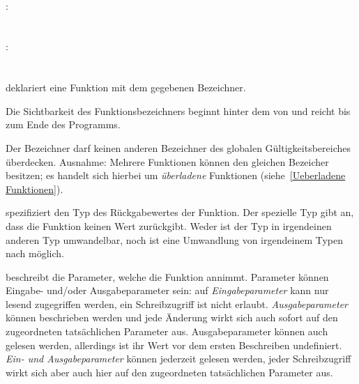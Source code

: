 \hspace*{1cm}\glq{}\grq \glq{}\grq  {}   \glq\Gt{=}\grq  {} \glq\Gt{,}\grq  {} \\
:\label{funktion_aufruf}\\
\hspace*{1cm}  \glq\Gt{(}\grq  \glq\Gt{)}\grq \\
\hspace*{1cm}  \glq\Gt{(}\grq {}  \glq\Gt{)}\grq \\
:\label{funktion_param_tatsaechl}\\
\hspace*{1cm} \\
\hspace*{1cm} \glq\Gt{,}\grq  {} \\


 deklariert eine Funktion mit dem gegebenen Bezeichner.

Die Sichtbarkeit des Funktionsbezeichners beginnt hinter dem \kw{)} von 
und reicht bis zum Ende des Programms.

Der Bezeichner darf keinen anderen Bezeichner des globalen Gültigkeitsbereiches überdecken.
Ausnahme: Mehrere Funktionen können den gleichen Bezeicher besitzen; es handelt sich hierbei
um \emph{überladene} Funktionen (siehe~\ref{Ueberladene Funktionen}).

 spezifiziert den Typ des Rückgabewertes der Funktion. Der spezielle Typ 
gibt an, dass die Funktion keinen Wert zurückgibt.
Weder ist der Typ  in irgendeinen anderen Typ umwandelbar, noch ist eine Umwandlung
von irgendeinem Typen nach  möglich.

 beschreibt die Parameter, welche die Funktion annimmt.
Parameter können Eingabe- und/oder Ausgabeparameter sein: auf \emph{Eingabeparameter} kann
nur lesend zugegriffen werden, ein Schreibzugriff ist nicht erlaubt.
\emph{Ausgabeparameter} können beschrieben werden und jede Änderung wirkt sich auch sofort auf
den zugeordneten tatsächlichen Parameter aus. Ausgabeparameter können auch gelesen werden,
allerdings ist ihr Wert vor dem ersten Beschreiben undefiniert.
\emph{Ein- und Ausgabeparameter} können jederzeit gelesen werden, jeder Schreibzugriff wirkt sich
aber auch hier auf den zugeordneten tatsächlichen Parameter aus.

